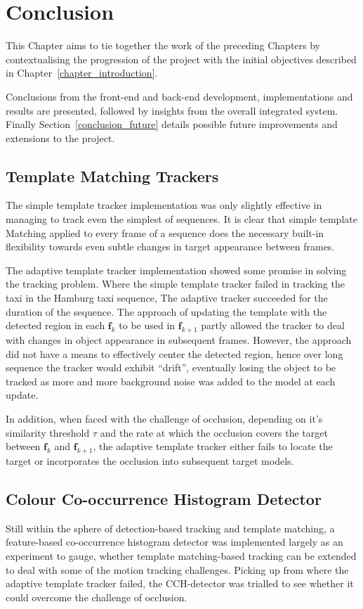 \chapter{Conclusion}
This Chapter aims to tie together the work of the preceding Chapters
by contextualising the progression of the project with the initial objectives 
described in Chapter~\ref{chapter_introduction}.

Conclusions from the front-end and back-end development, implementations and
results are presented, followed by insights from the overall integrated system.
Finally Section~\ref{conclusion_future} details possible future improvements and
extensions to the project.

\section{Template Matching Trackers}
The simple template tracker implementation was only slightly effective in
managing to track even the simplest of sequences. It is clear that simple template
Matching applied to every frame of a sequence does the necessary built-in
flexibility towards even subtle changes in target appearance between frames.

The adaptive template tracker implementation showed some promise in solving the
tracking problem. Where the simple template tracker failed in tracking the
taxi in the Hamburg taxi sequence, The adaptive tracker succeeded for the
duration of the sequence. 
The approach of updating the template with the detected region in each
$\mathbf{f}_k$ to be used in $\mathbf{f}_{k+1}$ partly allowed the tracker to
deal with changes in object appearance in subsequent frames. However, the
approach did not have a means to effectively center the detected region, hence
over long sequence the tracker would exhibit ``drift'', eventually losing the
object to be tracked as more and more background noise was added to the model at
each update.

In addition, when faced with the challenge of occlusion, depending on it's
similarity threshold $\tau$ and the rate at which the occlusion covers the
target between $\mathbf{f}_k$ and $\mathbf{f}_{k+1}$, the adaptive template
tracker either fails to locate the target or incorporates the occlusion into
subsequent target models.

\section{Colour Co-occurrence Histogram Detector}
Still within the sphere of detection-based tracking and template matching, a
feature-based co-occurrence histogram detector was implemented largely as an
experiment to gauge, whether template matching-based tracking can be extended to deal
with some of the motion tracking challenges. 
Picking up from where the adaptive template tracker failed, the CCH-detector was
trialled to see whether it could overcome the challenge of occlusion.

